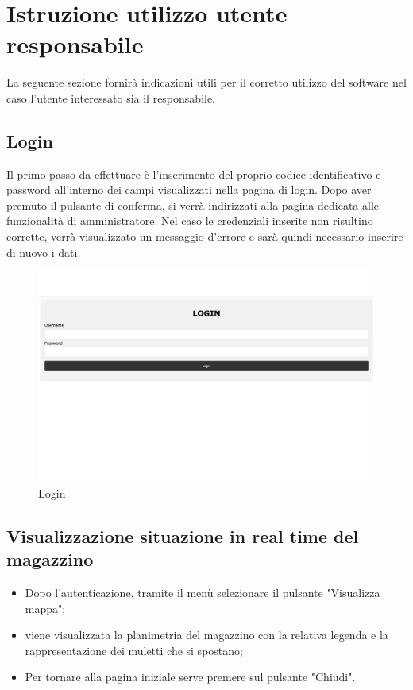 \section{Istruzione utilizzo utente responsabile}

La seguente sezione fornirà indicazioni utili per il corretto utilizzo del software nel caso l'utente interessato sia il responsabile.

\subsection{Login}
Il primo passo da effettuare è l'inserimento del proprio codice identificativo e password all'interno dei campi visualizzati nella pagina di login. Dopo aver premuto il pulsante di conferma, si verrà indirizzati alla pagina dedicata alle funzionalità di amministratore. Nel caso le credenziali inserite non risultino corrette, verrà visualizzato un messaggio d'errore e sarà quindi necessario inserire di nuovo i dati.
\begin{figure}[H]
    \centering
    \includegraphics[scale=0.12]{res/images/login.png}
    \caption{Login}
\end{figure}

\subsection{Visualizzazione situazione in real time del magazzino}
\begin{itemize}
    \item Dopo l'autenticazione, tramite il menù selezionare il pulsante "Visualizza mappa";
    \item viene visualizzata la planimetria del magazzino con la relativa legenda e la rappresentazione dei muletti che si spostano;
    \item Per tornare alla pagina iniziale serve premere sul pulsante "Chiudi".
\end{itemize}

